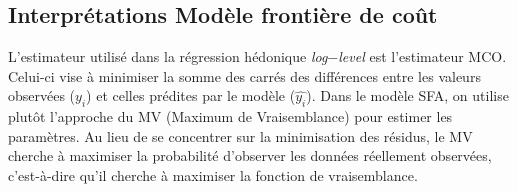 \documentclass[
  12pt,
]{report}
\begin{document}
\newpage

\subsection{Interprétations Modèle frontière de
coût}\label{interpruxe9tations-moduxe8le-frontiuxe8re-de-couxfbt}

\begin{tcolorbox}[enhanced jigsaw, leftrule=.75mm, toprule=.15mm, rightrule=.15mm, opacityback=0, opacitybacktitle=0.6, colframe=quarto-callout-tip-color-frame, breakable, colback=white, colbacktitle=quarto-callout-tip-color!10!white, coltitle=black, title=\textcolor{quarto-callout-tip-color}{\faLightbulb}\hspace{0.5em}{Un estimateur différent}, arc=.35mm, bottomtitle=1mm, toptitle=1mm, titlerule=0mm, bottomrule=.15mm, left=2mm]

L'estimateur utilisé dans la régression hédonique
\emph{log}\(-\)\emph{level} est l'estimateur MCO. Celui-ci vise à
minimiser la somme des carrés des différences entre les valeurs
observées (\(y_i\)) et celles prédites par le modèle (\(\hat{y_i}\)).
Dans le modèle SFA, on utilise plutôt l'approche du MV (Maximum de
Vraisemblance) pour estimer les paramètres. Au lieu de se concentrer sur
la minimisation des résidus, le MV cherche à maximiser la probabilité
d'observer les données réellement observées, c'est-à-dire qu'il cherche
à maximiser la fonction de vraisemblance.

\end{tcolorbox}
\end{document}
